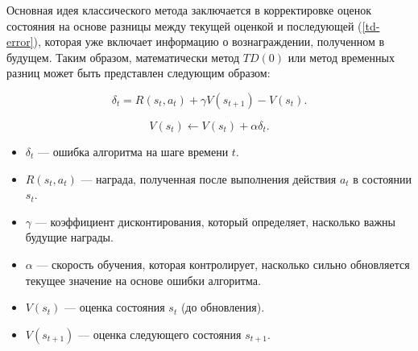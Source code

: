 Основная идея классического метода заключается в корректировке оценок состояния на основе разницы между текущей оценкой и последующей (\ref{td-error}), которая уже включает информацию о вознаграждении, полученном в будущем. Таким образом, математически метод $TD(0)$ или метод временных разниц может быть представлен следующим образом:

\pagebreak

\begin{equation}\label{td-error}
    \delta_t = R(s_t, a_t) + \gamma V(s_{t+1}) - V(s_t).
\end{equation}

\begin{equation}\label{td-base}
    V(s_t) \leftarrow V(s_t) + \alpha \delta_t.
\end{equation}

\begin{itemize}
    \item $\delta_t$ --- ошибка алгоритма на шаге времени $t$.
    \item $R(s_t, a_t)$ --- награда, полученная после выполнения действия $a_t$ в состоянии $s_t$.
    \item $\gamma$ --- коэффициент дисконтирования, который определяет, насколько важны будущие награды.
    \item $\alpha$ --- скорость обучения, которая контролирует, насколько сильно обновляется текущее значение на основе ошибки алгоритма.
    \item $V(s_t)$ --- оценка состояния $s_t$ (до обновления).
    \item $V(s_{t+1})$ --- оценка следующего состояния $s_{t+1}$.
\end{itemize}

